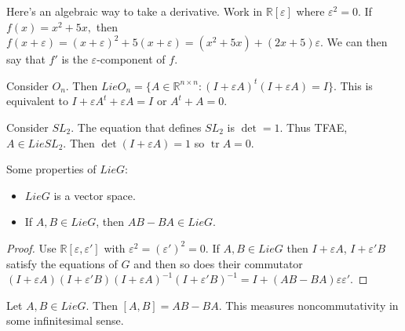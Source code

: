 \documentclass{article}
\newcommand{\R}{\mathbb{R}}
\newcommand{\eps}{\varepsilon}
\DeclareMathOperator{\tr}{tr}
\begin{document}
Here's an algebraic way to take a derivative. Work in $\R[\eps]$ where $\eps^2=0$. If $f(x)=x^2+5x,$ then $f(x+\eps)=(x+\eps)^2+5(x+\eps)=(x^2+5x)+(2x+5)\eps$. We can then say that $f'$ is the $\eps$-component of $f$.
\begin{example}
Consider $O_n$. Then $Lie O_n=\{A\in\R^{n\times n}:(I+\eps A)^t(I+\eps A)=I\}$. This is equivalent to $I+\eps A^t+\eps A=I$ or $A^t+A=0$.
\end{example}
\begin{example}
Consider $SL_2$. The equation that defines $SL_2$ is $\det=1$. Thus TFAE, $A\in Lie SL_2$. Then $\det(I+\eps A)=1$ so $\tr A=0$.
\end{example}
Some properties of $Lie G$:
\begin{itemize}
    \item $Lie G$ is a vector space.
    \item If $A,B\in Lie G$, then $AB-BA\in Lie G$. 
\end{itemize}
\begin{proof}
Use $\R[\eps,\eps']$ with $\eps^2=(\eps')^2=0$. If $A,B\in Lie G$ then $I+\eps A$, $I+\eps'B$ satisfy the equations of $G$ and then so does their commutator $(I+\eps A)(I+\eps'B)(I+\eps A)^{-1}(I+\eps' B)^{-1}=I+(AB-BA)\eps\eps'$.
\end{proof}
\begin{definition}
Let $A,B\in Lie G$. Then $[A,B]=AB-BA$. This measures noncommutativity in some infinitesimal sense. 
\end{definition}
\end{document}
